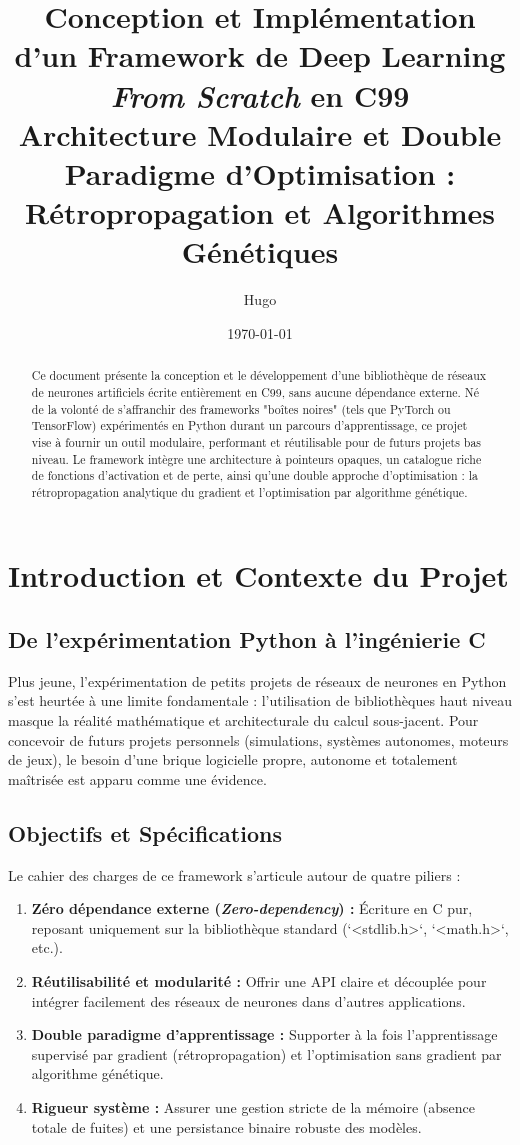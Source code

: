 \documentclass[11pt,a4paper]{article}
\title{\textbf{Conception et Implémentation d'un Framework de Deep Learning \textit{From Scratch} en C99} \\ \large Architecture Modulaire et Double Paradigme d'Optimisation : Rétropropagation et Algorithmes Génétiques}
\author{Hugo}
\date{\today}
\begin{document}
\maketitle

\begin{abstract}
Ce document présente la conception et le développement d'une bibliothèque de réseaux de neurones artificiels écrite entièrement en C99, sans aucune dépendance externe. Né de la volonté de s'affranchir des frameworks "boîtes noires" (tels que PyTorch ou TensorFlow) expérimentés en Python durant un parcours d'apprentissage, ce projet vise à fournir un outil modulaire, performant et réutilisable pour de futurs projets bas niveau. Le framework intègre une architecture à pointeurs opaques, un catalogue riche de fonctions d'activation et de perte, ainsi qu'une double approche d'optimisation : la rétropropagation analytique du gradient et l'optimisation par algorithme génétique.
\end{abstract}

\tableofcontents
\newpage

\section{Introduction et Contexte du Projet}

\subsection{De l'expérimentation Python à l'ingénierie C}
Plus jeune, l'expérimentation de petits projets de réseaux de neurones en Python s'est heurtée à une limite fondamentale : l'utilisation de bibliothèques haut niveau masque la réalité mathématique et architecturale du calcul sous-jacent. Pour concevoir de futurs projets personnels (simulations, systèmes autonomes, moteurs de jeux), le besoin d'une brique logicielle propre, autonome et totalement maîtrisée est apparu comme une évidence.

\subsection{Objectifs et Spécifications}
Le cahier des charges de ce framework s'articule autour de quatre piliers :
\begin{enumerate}
    \item \textbf{Zéro dépendance externe (\textit{Zero-dependency}) :} Écriture en C pur, reposant uniquement sur la bibliothèque standard (`<stdlib.h>`, `<math.h>`, etc.).
    \item \textbf{Réutilisabilité et modularité :} Offrir une API claire et découplée pour intégrer facilement des réseaux de neurones dans d'autres applications.
    \item \textbf{Double paradigme d'apprentissage :} Supporter à la fois l'apprentissage supervisé par gradient (rétropropagation) et l'optimisation sans gradient par algorithme génétique.
    \item \textbf{Rigueur système :} Assurer une gestion stricte de la mémoire (absence totale de fuites) et une persistance binaire robuste des modèles.
\end{enumerate}
\end{document}
